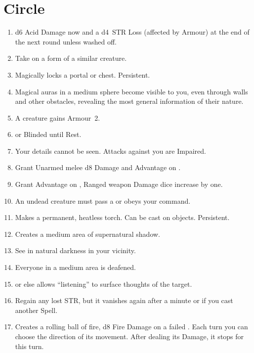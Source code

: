 \documentclass[itdr]{subfiles}
\begin{document}

\vfill
\break

\section{ Circle}
\def \spellcircle {2}
\begin{enumerate}
	\item {} d6 Acid Damage now and a d4~STR Loss (affected by Armour) at the end of the next round unless washed off.
	\item {} Take on a form of a similar creature.
	\item {} Magically locks a portal or chest. Persistent.
	\item {} Magical auras in a medium sphere become visible to you, even through walls and other obstacles, revealing the most general information of their nature.
	\item {} A creature gains Armour~2.
	\item {}  or Blinded until Rest.
	\item {} Your details cannot be seen. Attacks against you are Impaired.
	\item {} Grant Unarmed melee d8 Damage and Advantage on .
	\item {} Grant Advantage on , Ranged weapon Damage dice increase by one.
	\item {} An undead creature must pass a  or obeys your command.
	\item {} Makes a permanent, heatless torch. Can be cast on objects. Persistent.
	\item {} Creates a medium area of supernatural shadow.
	\item {} See in natural darkness in your vicinity.
	\item {} Everyone in a medium area is deafened.
	\item {}  or else allows \mbox{``listening''} to surface thoughts of the target.
	\item {} Regain any lost STR, but it vanishes again after a minute or if you cast another Spell.
	\item {} Creates a rolling ball of fire, d8 Fire Damage on a failed . Each turn you can choose the direction of its movement. After dealing its Damage, it stops for this turn.

\end{enumerate}
\end{document}
